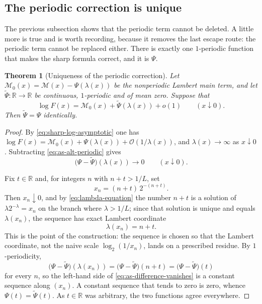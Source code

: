 \documentclass[11pt,oneside]{article}
\newtheorem{theorem}{Theorem}[section]
\theoremstyle{definition}
\theoremstyle{remark}
\newcommand{\R}{\mathbb R}
\newcommand{\bigO}{\mathcal O}
\newcommand{\smallo}{o}
\begin{document}
\subsection{The periodic correction is unique}
\label{subsec:as-uniqueness}

The previous subsection shows that the periodic term cannot be deleted.  A little more is
true and is worth recording, because it removes the last escape route: the periodic term
cannot be replaced either.  There is exactly one $1$-periodic function that makes the sharp
formula correct, and it is $\Psi$.

\begin{theorem}[Uniqueness of the periodic correction]
\label{thm:as-uniqueness}
Let $\mathcal M_0(x)=\mathcal M(x)-\Psi(\lambda(x))$ be the nonperiodic Lambert main term, and
let $\widetilde\Psi:\R\to\R$ be continuous, $1$-periodic and of mean zero.  Suppose that
\begin{equation}
 \log F(x)=\mathcal M_0(x)+\widetilde\Psi(\lambda(x))+\smallo(1)
 \qquad(x\downarrow0).                                    \label{eq:as-alt-periodic}
\end{equation}
Then $\widetilde\Psi=\Psi$ identically.
\end{theorem}

\begin{proof}
By \eqref{eq:sharp-log-asymptotic} one has
$\log F(x)=\mathcal M_0(x)+\Psi(\lambda(x))+\bigO(1/\lambda(x))$, and $\lambda(x)\to\infty$
as $x\downarrow0$.  Subtracting \eqref{eq:as-alt-periodic} gives
\begin{equation}
 \bigl(\Psi-\widetilde\Psi\bigr)(\lambda(x))\longrightarrow0
 \qquad(x\downarrow0).                                    \label{eq:as-difference-vanishes}
\end{equation}

Fix $t\in\R$ and, for integers $n$ with $n+t>1/L$, set
\begin{equation}
 x_n=(n+t)\,2^{-(n+t)}.                                   \label{eq:as-phase-locked-sequence}
\end{equation}
Then $x_n\downarrow0$, and by \eqref{eq:lambda-equation} the number $n+t$ is a solution of
$\lambda2^{-\lambda}=x_n$ on the branch where $\lambda>1/L$; since that solution is unique
and equals $\lambda(x_n)$, the sequence has exact Lambert coordinate
\begin{equation*}
 \lambda(x_n)=n+t.
\end{equation*}
This is the point of the construction: the sequence is chosen so that the Lambert coordinate,
not the naive scale $\log_2(1/x_n)$, lands on a prescribed residue.  By $1$-periodicity,
\begin{equation*}
 \bigl(\Psi-\widetilde\Psi\bigr)(\lambda(x_n))
 =\bigl(\Psi-\widetilde\Psi\bigr)(n+t)
 =\bigl(\Psi-\widetilde\Psi\bigr)(t)
\end{equation*}
for every $n$, so the left-hand side of \eqref{eq:as-difference-vanishes} is a constant
sequence along $(x_n)$.  A constant sequence that tends to zero is zero, whence
$\Psi(t)=\widetilde\Psi(t)$.  As $t\in\R$ was arbitrary, the two functions agree everywhere.
\end{proof}
\end{document}
